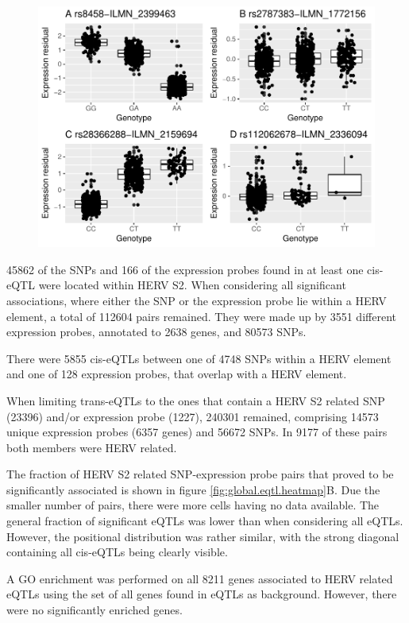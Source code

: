 \documentclass[a4paper,12pt,twoside,openright]{report}
\begin{document}
\begin{figure}[tb]
	\includegraphics[scale = 1, keepaspectratio = true]{../figures/best_worst_eqtl_boxplots.pdf}  
	\caption{}
    \label{fig:best.worst.eqtl.boxplot}
\end{figure}

45862 of the SNPs and 166 of the expression probes found in at least one cis-eQTL were located within HERV S2. When considering all significant associations, where either the SNP or the expression probe lie within a HERV element, a total of 112604 pairs remained. They were made up by 3551 different expression probes, annotated to 2638 genes, and 80573 SNPs. 

There were 5855 cis-eQTLs between one of 4748 SNPs within a HERV element and one of 128 expression probes, that overlap with a HERV element. 

When limiting trans-eQTLs to the ones that contain a HERV S2 related SNP (23396) and/or expression probe (1227), 240301 remained, comprising 14573 unique expression probes (6357 genes) and 56672 SNPs. In 9177 of these pairs both members were HERV related. 

The fraction of HERV S2 related SNP-expression probe pairs that proved to be significantly associated is shown in figure \ref{fig:global.eqtl.heatmap}B. Due the smaller number of pairs, there were more cells having no data available. The general fraction of significant eQTLs was lower than when considering all eQTLs. However, the positional distribution was rather similar, with the strong diagonal containing all cis-eQTLs being clearly visible.  

A GO enrichment was performed on all 8211 genes associated to HERV related eQTLs using the set of all genes found in eQTLs as background. However, there were no significantly enriched genes. 
\end{document}
